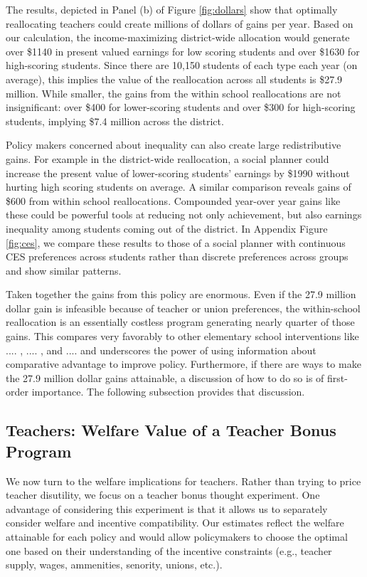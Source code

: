 \documentclass[12pt]{article}
\theoremstyle{definition}
\theoremstyle{definition}
\theoremstyle{definition}
\theoremstyle{definition}
\begin{document}
The results, depicted in Panel (b) of Figure \ref{fig:dollars} show that optimally reallocating teachers could create millions of dollars of gains per year. Based on our calculation, the income-maximizing district-wide allocation would generate over \$1140 in present valued earnings for low scoring students and over \$1630 for high-scoring students. Since there are 10,150 students of each type each year (on average), this implies the value of the reallocation across all students is  \$27.9 million. While smaller, the gains from the within school reallocations are not insignificant: over \$400 for lower-scoring students and over \$300 for high-scoring students, implying \$7.4 million across the district.

Policy makers concerned about inequality can also create large redistributive gains. For example in the district-wide reallocation, a social planner could increase the present value of lower-scoring students' earnings by \$1990 without hurting high scoring students on average. A similar comparison reveals gains of \$600 from within school reallocations. Compounded year-over year gains like these could be powerful tools at reducing not only achievement, but also earnings inequality among students coming out of the district. In Appendix Figure \ref{fig:ces}, we compare these results to those of a social planner with continuous CES preferences across students rather than discrete preferences across groups and show similar patterns.  

Taken together the gains from this policy are enormous. Even if the 27.9 million dollar gain is infeasible because of teacher or union preferences, the within-school reallocation is an essentially costless program generating nearly quarter of those gains. This compares very favorably to other elementary school interventions like .... \citep[][]{}, .... \citep[][]{}, and .... \citep[][]{} and underscores the power of using information about comparative advantage to improve policy. Furthermore, if there are ways to make the 27.9 million dollar gains attainable, a discussion of how to do so is of first-order importance. The following subsection provides that discussion.

\subsection{Teachers: Welfare Value of a Teacher Bonus Program}

We now turn to the welfare implications for teachers. Rather than trying to price teacher disutility, we focus on a teacher bonus thought experiment. One advantage of considering this experiment is that it allows us to separately consider welfare and incentive compatibility. Our estimates reflect the welfare attainable for each policy and would allow policymakers to choose the optimal one based on their understanding of the incentive constraints (e.g., teacher supply, wages, ammenities, senority, unions, etc.).
\end{document}
